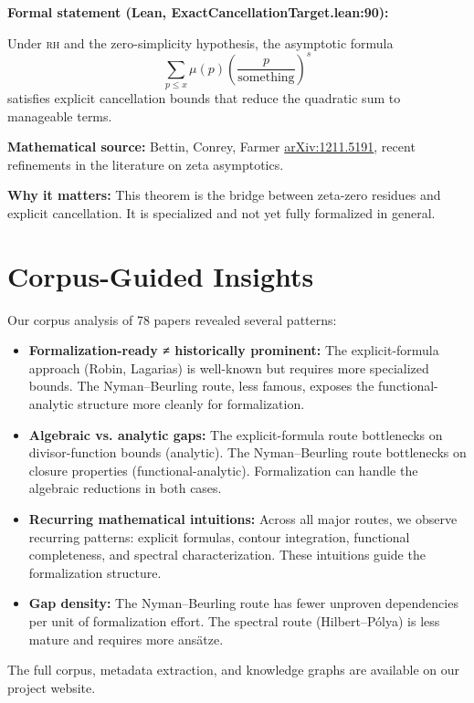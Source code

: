 \documentclass[11pt,a4paper]{article}
\newcommand{\RH}{\textsc{rh}\xspace}
\newcommand{\arxiv}[1]{\href{https://arxiv.org/abs/#1}{arXiv:#1}}
\begin{document}
\textbf{Formal statement (Lean, ExactCancellationTarget.lean:90):}

Under \RH and the zero-simplicity hypothesis, the asymptotic formula
\[
\sum_{p \le x} \mu(p) \left( \frac{p}{\text{something}} \right)^s
\]
satisfies explicit cancellation bounds that reduce the quadratic sum to manageable terms.

\textbf{Mathematical source:} Bettin, Conrey, Farmer \arxiv{1211.5191}, recent refinements in the literature on zeta asymptotics.

\textbf{Why it matters:} This theorem is the bridge between zeta-zero residues and explicit cancellation. It is specialized and not yet fully formalized in general.

\section{Corpus-Guided Insights}
\label{sec:corpus}

Our corpus analysis of 78 papers revealed several patterns:

\begin{itemize}
  \item \textbf{Formalization-ready ≠ historically prominent:} The explicit-formula approach (Robin, Lagarias) is well-known but requires more specialized bounds. The Nyman--Beurling route, less famous, exposes the functional-analytic structure more cleanly for formalization.

  \item \textbf{Algebraic vs. analytic gaps:} The explicit-formula route bottlenecks on divisor-function bounds (analytic). The Nyman--Beurling route bottlenecks on closure properties (functional-analytic). Formalization can handle the algebraic reductions in both cases.

  \item \textbf{Recurring mathematical intuitions:} Across all major routes, we observe recurring patterns: explicit formulas, contour integration, functional completeness, and spectral characterization. These intuitions guide the formalization structure.

  \item \textbf{Gap density:} The Nyman--Beurling route has fewer unproven dependencies per unit of formalization effort. The spectral route (Hilbert--Pólya) is less mature and requires more ansätze.
\end{itemize}

The full corpus, metadata extraction, and knowledge graphs are available on our project website.
\end{document}
